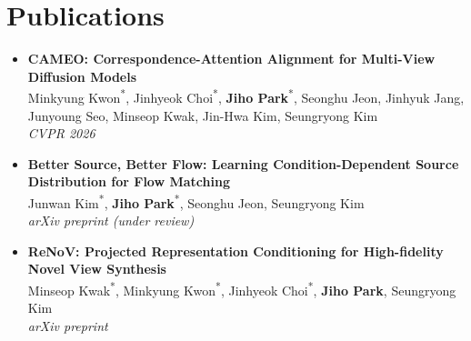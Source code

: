 \documentclass[letterpaper,11pt]{article}
\begin{document}
\section{Publications}
\vspace{3pt}
\begin{itemize}[leftmargin=*, label={}]
    \item \textbf{CAMEO: Correspondence-Attention Alignment for Multi-View Diffusion Models}\\
    Minkyung Kwon\textsuperscript{*}, Jinhyeok Choi\textsuperscript{*}, \textbf{Jiho Park}\textsuperscript{*}, Seonghu Jeon, Jinhyuk Jang, Junyoung Seo, Minseop Kwak, Jin-Hwa Kim, Seungryong Kim\\
    \textit{CVPR 2026}

    \item \textbf{Better Source, Better Flow: Learning Condition-Dependent Source Distribution for Flow Matching}\\
    Junwan Kim\textsuperscript{*}, \textbf{Jiho Park}\textsuperscript{*}, Seonghu Jeon, Seungryong Kim\\
    \textit{arXiv preprint (under review)}

    \item \textbf{ReNoV: Projected Representation Conditioning for High-fidelity Novel View Synthesis}\\
    Minseop Kwak\textsuperscript{*}, Minkyung Kwon\textsuperscript{*}, Jinhyeok Choi\textsuperscript{*}, \textbf{Jiho Park}, Seungryong Kim\\
    \textit{arXiv preprint}
\end{itemize}








\end{document}

